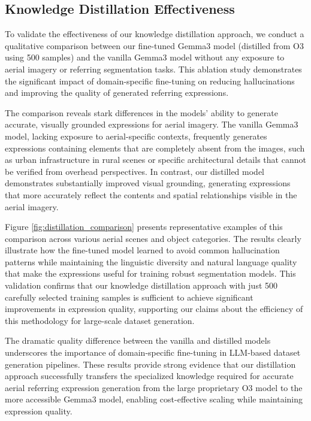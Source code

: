 \subsection{Knowledge Distillation Effectiveness}
\label{subsec:distillation_ablation}

To validate the effectiveness of our knowledge distillation approach, we conduct a qualitative comparison between our fine-tuned Gemma3 model (distilled from O3 using 500 samples) and the vanilla Gemma3 model without any exposure to aerial imagery or referring segmentation tasks. This ablation study demonstrates the significant impact of domain-specific fine-tuning on reducing hallucinations and improving the quality of generated referring expressions.

The comparison reveals stark differences in the models' ability to generate accurate, visually grounded expressions for aerial imagery. The vanilla Gemma3 model, lacking exposure to aerial-specific contexts, frequently generates expressions containing elements that are completely absent from the images, such as urban infrastructure in rural scenes or specific architectural details that cannot be verified from overhead perspectives. In contrast, our distilled model demonstrates substantially improved visual grounding, generating expressions that more accurately reflect the contents and spatial relationships visible in the aerial imagery.

Figure \ref{fig:distillation_comparison} presents representative examples of this comparison across various aerial scenes and object categories. The results clearly illustrate how the fine-tuned model learned to avoid common hallucination patterns while maintaining the linguistic diversity and natural language quality that make the expressions useful for training robust segmentation models. This validation confirms that our knowledge distillation approach with just 500 carefully selected training samples is sufficient to achieve significant improvements in expression quality, supporting our claims about the efficiency of this methodology for large-scale dataset generation.

The dramatic quality difference between the vanilla and distilled models underscores the importance of domain-specific fine-tuning in LLM-based dataset generation pipelines. These results provide strong evidence that our distillation approach successfully transfers the specialized knowledge required for accurate aerial referring expression generation from the large proprietary O3 model to the more accessible Gemma3 model, enabling cost-effective scaling while maintaining expression quality.

